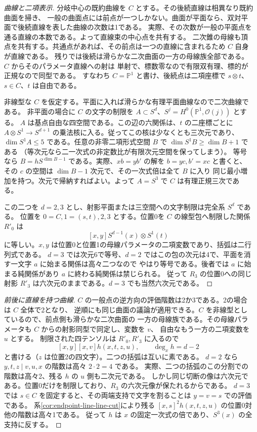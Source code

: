 \begin{proof}[曲線と二項表示]
分岐中心の既約曲線を $C$ とする。その後続直線は相異なり既約曲面を掃き、
一般の曲面点には前点が一つしかない。曲面が平面なら、双対平面で後続直線を表した曲線の次数は1である。
実際、その次数が一般の平面点を通る直線の本数である。よって直線束の中心点を共有する。
二次錐の母線も頂点を共有する。共通点があれば、その前点は一つの直線に含まれるため $C$ 自身が直線である。
残りでは後続は滑らかな二次曲面の一方の母線族全部である。$C$ からそのパラメータ直線への射は
単射で、標数零なので有限双有理、標的が正規なので同型である。
すなわち $C=\mathbb P^1$ と書け、後続点は二項座標で $s\otimes t$、$s\in C$、$t$ は自由である。

非線型な $C$ を仮定する。平面に入れば滑らかな有理平面曲線なので二次曲線である。
非平面の場合に $C$ の文字の制限を $A\subset S^d$、$S^j=H^0(\mathbb P^1,\mathcal O(j))$ とする。
$A$ は基点自由な四空間である。この辺の六関係は、$t$ の二座標ごとに
$A\otimes S^1\to S^{d+1}$ の乗法核に入る。従ってこの核は少なくとも三次元であり、
$\dim S^1 A\le5$ である。任意の非零二項形式空間 $B$ で $\dim S^1B\ge\dim B+1$ である
（等次元なら二一次式の非定数比が有限次元空間を保ってしまう）。
等号なら $B=h S^{\dim B-1}$ である。実際、$x b=y b'$ の解を
$b=y c,b'=x c$ と書くと、その $c$ の空間は $\dim B-1$ 次元で、その一次式倍は全て $B$ に入り
同じ最小増加を持つ。次元で帰納すればよい。よって $A=S^3$ で $C$ は有理正規三次である。

この二つを $d=2,3$ とし、射影平面または三空間への文字制限は完全系 $S^d$ である。
位置を $0=C,1=(s,t),2,3$ とする。位置0を $C$ の線型包へ制限した関係 $R'_0$ は
\[
        [x,y]S^{d-1}(x)\otimes S^1(t)
\]
に等しい。$x,y$ は位置0と位置1の母線パラメータの二項変数であり、括弧は二行列式である。
$d=3$ では次元6で等号、$d=2$ ではこの包の次元は4で、平面を消す一文字 $a$ に始まる関係は高々二つなので
やはり等号である。後者では $a$ に始まる純関係があり $a$ に終わる純関係は禁じられる。
従って $R_3$ の位置0への同じ射影 $R'_3$ は六次元のままである。$d=3$ でも当然六次元である。
\end{proof}

\begin{proof}[前後に直線を持つ曲線]
$C$ の一般点の逆方向の評価階数は2か3である。2の場合は $C$ 全体で2となり、
逆順にも同じ曲面の議論が適用できる。$C$ を非線型としているので、前点側も滑らかな二次曲面の
一方の母線族である。その母線パラメータも $C$ からの射影同型で同定し、変数を $v$、
自由なもう一方の二項変数を $u$ とする。
制限された四テンソルは $R'_0,R'_3$ に入るので
\[
              [x,y][x,v]h(x,t,z,u),\qquad \deg_x h=d-2
\]
と書ける（$z$ は位置2の四文字）。二つの括弧は互いに素である。
$d=2$ なら $y,t,z\mid v,u,x$ の階数は高々 $2\cdot2=4$ である。
実際、二つの括弧のこの分割での階数は高々2、残る $h$ の $u$ 側も二次元である。
しかし同じ切断の像は六次元である。位置0だけを制限しており、$R_3$ の六次元像が保たれるからである。
$d=3$ では $s\in C$ を固定すると、その両端支持で文字を割ることは $y=v=s$ での評価である。
系\ref{cor:endpoint-line-line-cut}により残る $[x,s]^2h(x,t,z,u)$ の位置0対他の階数は高々1である。
従って $h$ は $x$ の固定一次式の倍であり、$S^3(x)$ の全支持に反する。
\end{proof}

